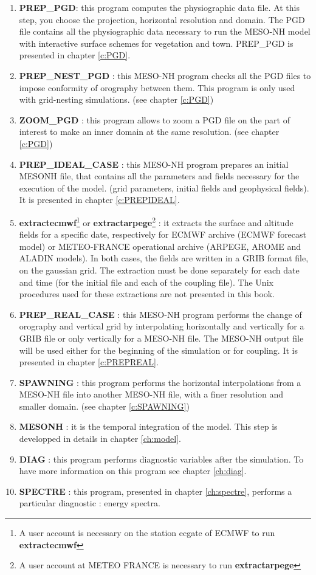 \begin{enumerate}
\item
{\bf PREP\_PGD}: this program computes the physiographic data file.
 At this step, you choose the projection, horizontal resolution
and domain. The PGD file contains all the physiographic data
necessary to run the MESO-NH model with interactive surface schemes for
vegetation and town. PREP\_PGD is presented in chapter \ref{c:PGD}.
\item
{\bf PREP\_NEST\_PGD }: this MESO-NH program checks all the PGD files  to impose
conformity of orography between them. This program is only used with grid-nesting simulations. (see chapter \ref{c:PGD})
\item 
{\bf ZOOM\_PGD }: this program allows to zoom  a PGD file  on the part of interest to make an inner domain at the same resolution. (see chapter \ref{c:PGD})
\item 
{\bf PREP\_IDEAL\_CASE }: this MESO-NH program prepares an initial MESONH file, 
that contains all the parameters and fields necessary for the execution of the model.
 (grid parameters, initial fields and geophysical fields). It is presented in chapter \ref{c:PREPIDEAL}.
\item
{\bf extractecmwf}\footnote{A user account is necessary on the station ecgate of ECMWF to run
{\bf extractecmwf}} 
or {\bf extractarpege}\footnote{A user account at METEO FRANCE is necessary to run
{\bf extractarpege}} 
: it extracts the surface
and altitude fields for a specific date, respectively for ECMWF archive 
(ECMWF forecast model) or
METEO-FRANCE operational archive (ARPEGE, AROME and ALADIN models).
In both cases, the fields are written in a GRIB format file, on the gaussian
grid. The extraction must be done separately for each date and time (for
the initial file and each of the coupling file). The Unix procedures used for these extractions are not presented in this book.
\item 
{\bf PREP\_REAL\_CASE }: this MESO-NH program performs the change of
orography and vertical grid by interpolating horizontally and vertically for a 
GRIB file or only vertically for a MESO-NH file. The MESO-NH output file  will
 be used either for the beginning of the simulation or for coupling. It is presented in chapter \ref{c:PREPREAL}.
\item
{\bf SPAWNING} : this program performs the horizontal interpolations from a
MESO-NH file into another MESO-NH file, with a finer resolution and smaller
domain. (see chapter \ref{c:SPAWNING})
\item
{\bf MESONH } : it is the temporal integration of the model. This step is developped in details in chapter \ref{ch:model}.
\item 
{\bf DIAG } : this program performs diagnostic variables after the simulation. To have more information on this program see chapter \ref{ch:diag}.
\item
{\bf SPECTRE }: this program, presented in chapter \ref{ch:spectre}, performs a particular diagnostic : energy spectra.
\end{enumerate} 

